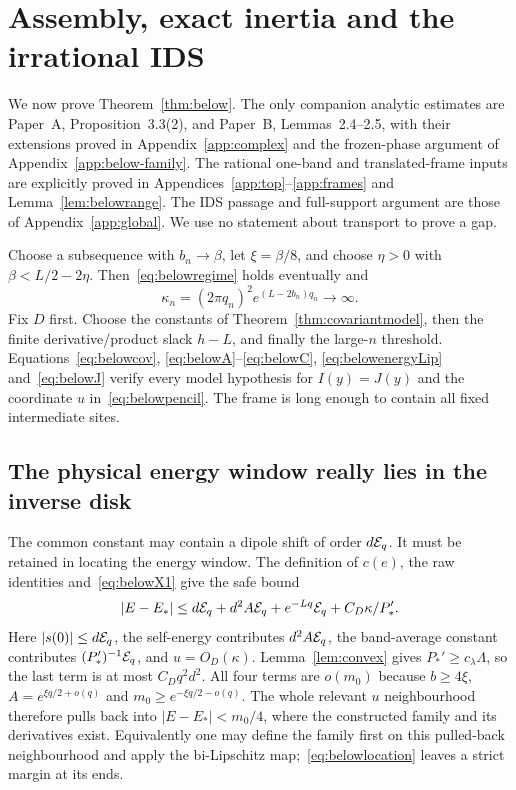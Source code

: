 \section{Assembly, exact inertia and the irrational IDS}\label{app:below-assembly}
We now prove Theorem~\ref{thm:below}. The only companion analytic estimates are Paper~A, Proposition~3.3(2), and Paper~B, Lemmas~2.4--2.5, with their extensions proved in Appendix~\ref{app:complex} and the frozen-phase argument of Appendix~\ref{app:below-family}. The rational one-band and translated-frame inputs are explicitly proved in Appendices~\ref{app:top}--\ref{app:frames} and Lemma~\ref{lem:belowrange}. The IDS passage and full-support argument are those of Appendix~\ref{app:global}. We use no statement about transport to prove a gap.

Choose a subsequence with $b_n\to\beta$, let $\xi=\beta/8$, and choose $\eta>0$ with $\beta<L/2-2\eta$. Then~\eqref{eq:belowregime} holds eventually and
\[
 \kappa_n=(2\pi q_n)^2e^{(L-2b_n)q_n}\longrightarrow\infty.
\]
Fix $D$ first. Choose the constants of Theorem~\ref{thm:covariantmodel}, then the finite derivative/product slack $h-L$, and finally the large-$n$ threshold. Equations~\eqref{eq:belowcov}, \eqref{eq:belowA}--\eqref{eq:belowC}, \eqref{eq:belowenergyLip} and~\eqref{eq:belowJ} verify every model hypothesis for $I(y)=J(y)$ and the coordinate $u$ in~\eqref{eq:belowpencil}. The frame is long enough to contain all fixed intermediate sites.

\subsection{The physical energy window really lies in the inverse disk}
The common constant may contain a dipole shift of order $d\mathcal E_q$. It must be retained in locating the energy window. The definition of $c(e)$, the raw identities and~\eqref{eq:belowX1} give the safe bound
\begin{equation}\label{eq:belowlocation}
 |E-E_*|\le d\mathcal E_q+d^2A\mathcal E_q+e^{-Lq}\mathcal E_q+
                                  C_D\kappa/P_*'.
\end{equation}
Here $|s(0)|\le d\mathcal E_q$, the self-energy contributes $d^2A\mathcal E_q$, the band-average constant contributes $(P_*')^{-1}\mathcal E_q$, and $u=O_D(\kappa)$. Lemma~\ref{lem:convex} gives $P_*'\ge c_\lambda\Lambda$, so the last term is at most $C_Dq^2d^2$. All four terms are $o(m_0)$ because $b\ge4\xi$, $A=e^{\xi q/2+o(q)}$ and $m_0\ge e^{-\xi q/2-o(q)}$. The whole relevant $u$ neighbourhood therefore pulls back into $|E-E_*|<m_0/4$, where the constructed family and its derivatives exist. Equivalently one may define the family first on this pulled-back neighbourhood and apply the bi-Lipschitz map;~\eqref{eq:belowlocation} leaves a strict margin at its ends.

